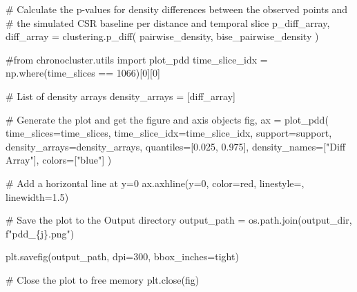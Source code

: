 \documentclass[
  11pt,
  letterpaper,
  DIV=11,
  numbers=noendperiod]{scrartcl}
\newenvironment{Shaded}{\begin{snugshade}}{\end{snugshade}}
\newcommand{\CommentTok}[1]{\textcolor[rgb]{0.37,0.37,0.37}{#1}}
\newcommand{\DecValTok}[1]{\textcolor[rgb]{0.68,0.00,0.00}{#1}}
\newcommand{\FloatTok}[1]{\textcolor[rgb]{0.68,0.00,0.00}{#1}}
\newcommand{\NormalTok}[1]{\textcolor[rgb]{0.00,0.23,0.31}{#1}}
\newcommand{\OperatorTok}[1]{\textcolor[rgb]{0.37,0.37,0.37}{#1}}
\newcommand{\SpecialCharTok}[1]{\textcolor[rgb]{0.37,0.37,0.37}{#1}}
\newcommand{\SpecialStringTok}[1]{\textcolor[rgb]{0.13,0.47,0.30}{#1}}
\newcommand{\StringTok}[1]{\textcolor[rgb]{0.13,0.47,0.30}{#1}}
\begin{document}
\begin{Shaded}
\begin{Highlighting}[]
    \CommentTok{\# Calculate the p{-}values for density differences between the observed points and }
    \CommentTok{\# the simulated CSR baseline per distance and temporal slice}
\NormalTok{    p\_diff\_array, diff\_array }\OperatorTok{=}\NormalTok{ clustering.p\_diff(}
\NormalTok{        pairwise\_density, }
\NormalTok{        bise\_pairwise\_density}
\NormalTok{    )}

    \CommentTok{\#from chronocluster.utils import plot\_pdd}
\NormalTok{    time\_slice\_idx }\OperatorTok{=}\NormalTok{ np.where(time\_slices }\OperatorTok{==} \DecValTok{1066}\NormalTok{)[}\DecValTok{0}\NormalTok{][}\DecValTok{0}\NormalTok{]}

    \CommentTok{\# List of density arrays}
\NormalTok{    density\_arrays }\OperatorTok{=}\NormalTok{ [diff\_array]}

    \CommentTok{\# Generate the plot and get the figure and axis objects}
\NormalTok{    fig, ax }\OperatorTok{=}\NormalTok{ plot\_pdd(}
\NormalTok{        time\_slices}\OperatorTok{=}\NormalTok{time\_slices,}
\NormalTok{        time\_slice\_idx}\OperatorTok{=}\NormalTok{time\_slice\_idx,}
\NormalTok{        support}\OperatorTok{=}\NormalTok{support,}
\NormalTok{        density\_arrays}\OperatorTok{=}\NormalTok{density\_arrays,}
\NormalTok{        quantiles}\OperatorTok{=}\NormalTok{[}\FloatTok{0.025}\NormalTok{, }\FloatTok{0.975}\NormalTok{],}
\NormalTok{        density\_names}\OperatorTok{=}\NormalTok{[}\StringTok{"Diff Array"}\NormalTok{],}
\NormalTok{        colors}\OperatorTok{=}\NormalTok{[}\StringTok{"blue"}\NormalTok{]}
\NormalTok{    )}

    \CommentTok{\# Add a horizontal line at y=0}
\NormalTok{    ax.axhline(y}\OperatorTok{=}\DecValTok{0}\NormalTok{, color}\OperatorTok{=}\StringTok{\textquotesingle{}red\textquotesingle{}}\NormalTok{, linestyle}\OperatorTok{=}\StringTok{\textquotesingle{}{-}{-}\textquotesingle{}}\NormalTok{, linewidth}\OperatorTok{=}\FloatTok{1.5}\NormalTok{)}

    \CommentTok{\# Save the plot to the Output directory}
\NormalTok{    output\_path }\OperatorTok{=}\NormalTok{ os.path.join(output\_dir, }\SpecialStringTok{f"pdd\_}\SpecialCharTok{\{}\NormalTok{j}\SpecialCharTok{\}}\SpecialStringTok{.png"}\NormalTok{)}

\NormalTok{    plt.savefig(output\_path, dpi}\OperatorTok{=}\DecValTok{300}\NormalTok{, bbox\_inches}\OperatorTok{=}\StringTok{\textquotesingle{}tight\textquotesingle{}}\NormalTok{)}

    \CommentTok{\# Close the plot to free memory}
\NormalTok{    plt.close(fig)}
\end{Highlighting}
\end{Shaded}
\end{document}
